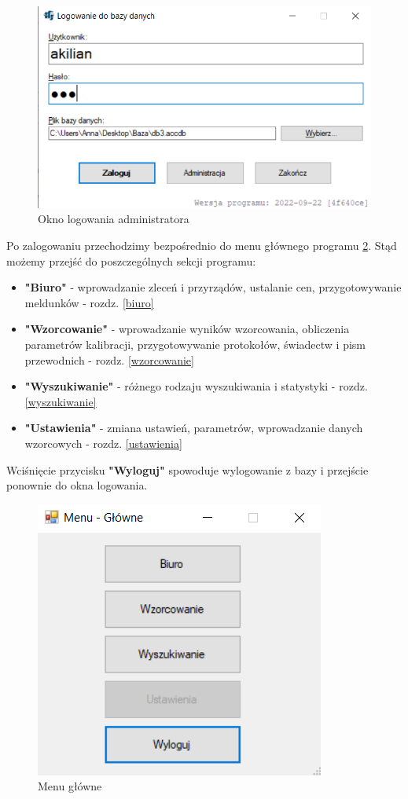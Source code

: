 \begin{figure}[htb]
	\centering
	\includegraphics{obrazki/Logowanie/logowanie_administracja.png}
	\caption{Okno logowania administratora}
	\label{oknoLogowaniaAdmina}
\end{figure}

Po zalogowaniu przechodzimy bezpośrednio do menu głównego programu \ref{menuGlowne}. Stąd możemy przejść do poszczególnych sekcji programu:
\begin{itemize}
	\item \textbf{"Biuro"} - wprowadzanie zleceń i przyrządów, ustalanie cen, przygotowywanie meldunków - rozdz. \ref{biuro}
	\item \textbf{"Wzorcowanie"} - wprowadzanie wyników wzorcowania, obliczenia parametrów kalibracji, przygotowywanie protokołów, świadectw i pism przewodnich - rozdz. \ref{wzorcowanie}
	\item \textbf{"Wyszukiwanie"} - różnego rodzaju wyszukiwania i statystyki - rozdz. \ref{wyszukiwanie}
	\item \textbf{"Ustawienia"} - zmiana ustawień, parametrów, wprowadzanie danych wzorcowych - rozdz. \ref{ustawienia}
\end{itemize}

Wciśnięcie przycisku \textbf{"Wyloguj"} spowoduje wylogowanie z bazy i przejście ponownie do okna logowania.

\begin{figure}[htb]
	\centering
	\includegraphics{obrazki/Logowanie/menu_glowne.png}
	\caption{Menu główne}
	\label{menuGlowne}
\end{figure}

